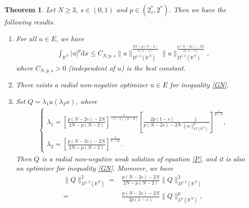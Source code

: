 \documentclass[12pt,a4paper,reqno]{amsart}
\numberwithin{equation}{section}
\newtheorem{theorem}{Theorem}[section]
\begin{document}
\begin{theorem}\label{Theorem1.1}
Let $N\geqslant3$, $s\in(0,1)$ and $p\in (2^{*}_{s},2^{*})$.
Then we have the following results.

\begin{enumerate}
\item [(1)]
For all $u\in E$, we have
\begin{equation*}
\begin{aligned}
\int_{\mathbb{R}^{N}}
|u|^{p}
\mathrm{d}x
\leqslant
C_{N,p,s}
\|u\|_{D^{s,2}(\mathbb{R}^{N})}^{\frac{2N-p(N-2)}{2(1-s)}}
\|u\|_{D^{1,2}(\mathbb{R}^{N})}^{\frac{p(N-2s)-2N}{2(1-s)}},
\end{aligned}
\end{equation*}
where $C_{N,p,s}>0$ (independent of $u$) is the best constant.

\item [(2)]
There exists a radial non-negative optimizer $u\in E$ for inequality \eqref{GN}.

\item [(3)]
Set $Q=\lambda_{1}u(\lambda_{2}x)$, where
\begin{equation*}
\begin{aligned}
\begin{cases}
\lambda_{1}=
\left[
\frac{p(N-2s)-2N}{2N-p(N-2)}
\right]^{\frac{1}{(1-s)(p-2)}}
\left[
\frac{2p(1-s)}{p(N-2s)-2N}
\frac{1}{\|u\|_{L^{p}(\mathbb{R}^{N})}^{p}}
\right]^{\frac{1}{p-2}},\\
\lambda_{2}=
\left[
\frac{p(N-2s)-2N}{2N-p(N-2)}
\right]^{\frac{1}{2-2s}}.
\end{cases}
\end{aligned}
\end{equation*}
Then $Q$ is a radial non-negative weak solution of equation \eqref{P}, and it is also an optimizer for inequality \eqref{GN}. Moreover, we have
\begin{equation}\label{1.5}
\begin{aligned}
\|Q\|_{D^{1,2}(\mathbb{R}^{N})}^{2}
=&
\frac{p(N-2s)-2N}{2N-p(N-2)}
\|Q\|_{D^{s,2}(\mathbb{R}^{N})}^{2}\\
=&
\frac{p(N-2s)-2N}{2p(1-s)}
\|Q\|_{L^{p}(\mathbb{R}^{N})}^{p},
\end{aligned}
\end{equation}


\end{enumerate}
\end{theorem}
\end{document}
